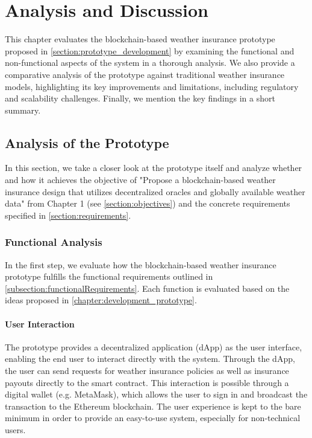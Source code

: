 \chapter{Analysis and Discussion}\label{chapter:analysis_discussion}
This chapter evaluates the blockchain-based weather insurance prototype proposed in \cref{section:prototype_development} by examining the functional and non-functional aspects of the system in a thorough analysis. We also provide a comparative analysis of the prototype against traditional weather insurance models, highlighting its key improvements and limitations, including regulatory and scalability challenges. Finally, we mention the key findings in a short summary.

\section{Analysis of the Prototype}
In this section, we take a closer look at the prototype itself and analyze whether and how it achieves the objective of "Propose a blockchain-based weather insurance design that utilizes decentralized oracles and globally available weather data" from Chapter 1 (see \cref{section:objectives}) and the concrete requirements specified in \cref{section:requirements}.

\subsection{Functional Analysis}
In the first step, we evaluate how the blockchain-based weather insurance prototype fulfills the functional requirements outlined in \cref{subsection:functionalRequirements}. Each function is evaluated based on the ideas proposed in \cref{chapter:development_prototype}.

\subsubsection{User Interaction}
The prototype provides a decentralized application (dApp) as the user interface, enabling the end user to interact directly with the system. Through the dApp, the user can send requests for weather insurance policies as well as insurance payouts directly to the smart contract. This interaction is possible through a digital wallet (e.g. MetaMask), which allows the user to sign in and broadcast the transaction to the Ethereum blockchain. The user experience is kept to the bare minimum in order to provide an easy-to-use system, especially for non-technical users.

